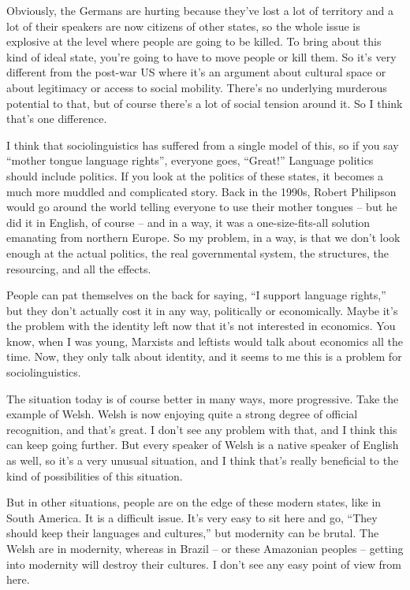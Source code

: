 \documentclass[output=paper]{langscibook}
\begin{document}
Obviously, the Germans are hurting because they’ve lost a lot of territory and a lot of their speakers are now citizens of other states, so the whole issue is explosive at the level where people are going to be killed. To bring about this kind of ideal state, you’re going to have to move people or kill them. So it’s very different from the post-war US where it’s an argument about cultural space or about legitimacy or access to social mobility. There’s no underlying murderous potential to that, but of course there’s a lot of social tension around it. So I think that’s one difference.

I think that sociolinguistics has suffered from a single model of this, so if you say “mother tongue language rights”, everyone goes, “Great!” Language politics should include politics. If you look at the politics of these states, it becomes a much more muddled and complicated story. Back in the 1990s, Robert Philipson would go around the world telling everyone to use their mother tongues – but he did it in English, of course – and in a way, it was a one-size-fits-all solution emanating from northern Europe. So my problem, in a way, is that we don’t look enough at the actual politics, the real governmental system, the structures, the resourcing, and all the effects. 

People can pat themselves on the back for saying, “I support language rights,” but they don’t actually cost it in any way, politically or economically. Maybe it’s the problem with the identity left now that it’s not interested in economics. You know, when I was young, Marxists and leftists would talk about economics all the time. Now, they only talk about identity, and it seems to me this is a problem for sociolinguistics.

The situation today is of course better in many ways, more progressive. Take the example of Welsh. Welsh is now enjoying quite a strong degree of official recognition, and that’s great. I don’t see any problem with that, and I think this can keep going further. But every speaker of Welsh is a native speaker of English as well, so it’s a very unusual situation, and I think that’s really beneficial to the kind of possibilities of this situation. 

But in other situations, people are on the edge of these modern states, like in South America. It is a difficult issue. It’s very easy to sit here and go, “They should keep their languages and cultures,” but modernity can be brutal. The Welsh are in modernity, whereas in Brazil – or these Amazonian peoples – getting into modernity will destroy their cultures. I don’t see any easy point of view from here. 
\end{document}
